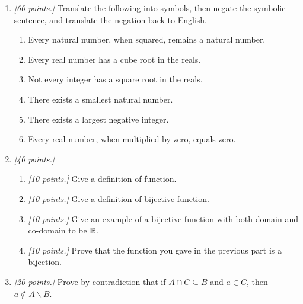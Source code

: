 \documentclass[12pt]{amsart}
\begin{document}
\begin{enumerate}[label=\arabic*.,itemsep=10pt, leftmargin=*]

	\item \textit{[60 points.]}
	      Translate the following into symbols, then negate the symbolic sentence, and translate the negation back to English.
	      \begin{enumerate}
		      \item Every natural number, when squared, remains a natural number.
		            \vspace{5cm}
		      \item Every real number has a cube root in the reals.
		            \vspace{5cm}
		      \item Not every integer has a square root in the reals.
		            \vspace{5cm}
		      \item There exists a smallest natural number.
		            \vspace{5cm}
		      \item There exists a largest negative integer.
		            \vspace{5cm}
		      \item Every real number, when multiplied by zero, equals zero.
	      \end{enumerate}

	      \newpage

	      \item\textit{[40 points.]}
	      \begin{enumerate}
		      \item \textit{[10 points.]}
		            Give a definition of function.
		            \vspace{7cm}

		      \item \textit{[10 points.]}
		            Give a definition of bijective function.
		            \vspace{7cm}
		      \item \textit{[10 points.]}
		            Give an example of a bijective function with both domain and co-domain to be $\mathbb{R}$.
		            \vspace{7cm}

		      \item \textit{[10 points.]}
		            Prove that the function you gave in the previous part is a bijection.
		            \vspace{7cm}


	      \end{enumerate}

	      \newpage

	\item \textit{[20 points.]} Prove by contradiction that if $A\cap C \subseteq B$ and $a \in C$, then
	      $a \not\in A \backslash B$.
	      \newpage


\end{enumerate}



\printbibliography
%
%
\end{document}
